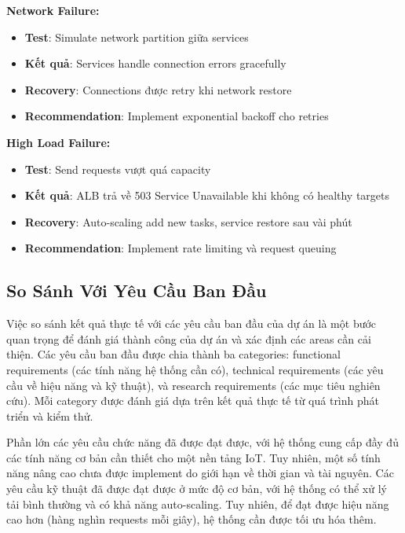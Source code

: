 \textbf{Network Failure:}
\begin{itemize}
    \item \textbf{Test}: Simulate network partition giữa services
    \item \textbf{Kết quả}: Services handle connection errors gracefully
    \item \textbf{Recovery}: Connections được retry khi network restore
    \item \textbf{Recommendation}: Implement exponential backoff cho retries
\end{itemize}

\textbf{High Load Failure:}
\begin{itemize}
    \item \textbf{Test}: Send requests vượt quá capacity
    \item \textbf{Kết quả}: ALB trả về 503 Service Unavailable khi không có healthy targets
    \item \textbf{Recovery}: Auto-scaling add new tasks, service restore sau vài phút
    \item \textbf{Recommendation}: Implement rate limiting và request queuing
\end{itemize}

\subsection{So Sánh Với Yêu Cầu Ban Đầu}

Việc so sánh kết quả thực tế với các yêu cầu ban đầu của dự án là một bước quan trọng để đánh giá thành công của dự án và xác định các areas cần cải thiện. Các yêu cầu ban đầu được chia thành ba categories: functional requirements (các tính năng hệ thống cần có), technical requirements (các yêu cầu về hiệu năng và kỹ thuật), và research requirements (các mục tiêu nghiên cứu). Mỗi category được đánh giá dựa trên kết quả thực tế từ quá trình phát triển và kiểm thử.

Phần lớn các yêu cầu chức năng đã được đạt được, với hệ thống cung cấp đầy đủ các tính năng cơ bản cần thiết cho một nền tảng IoT. Tuy nhiên, một số tính năng nâng cao chưa được implement do giới hạn về thời gian và tài nguyên. Các yêu cầu kỹ thuật đã được đạt được ở mức độ cơ bản, với hệ thống có thể xử lý tải bình thường và có khả năng auto-scaling. Tuy nhiên, để đạt được hiệu năng cao hơn (hàng nghìn requests mỗi giây), hệ thống cần được tối ưu hóa thêm.

